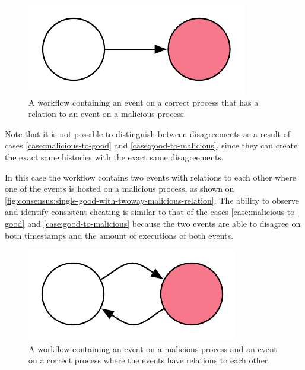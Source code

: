 	\begin{figure}[H]
		\centering
		\includegraphics[]{5validation/images/2.pdf}
		\caption{A workflow containing an event on a correct process that has a relation to an event on a malicious process.}
		\label{fig:consensus:single-good-with-malicious-relation}
	\end{figure}

	\noindent Note that it is not possible to distinguish between disagreements as a result of cases \ref{case:malicious-to-good} and \ref{case:good-to-malicious}, since they can create the exact same histories with the exact same disagreements.
	
	\begin{case}
		In this case the workflow contains two events with relations to each other where one of the events is hosted on a malicious process, as shown on \autoref{fig:consensus:single-good-with-twoway-malicious-relation}. The ability to observe and identify consistent cheating is similar to that of the cases \ref{case:malicious-to-good} and \ref{case:good-to-malicious} because the two events are able to disagree on both timestamps and the amount of executions of both events.
	\end{case}
	
	\begin{figure}[H]
		\centering
		\includegraphics[]{5validation/images/6.pdf}
		\caption{A workflow containing an event on a malicious process and an event on a correct process where the events have relations to each other.}
		\label{fig:consensus:single-good-with-twoway-malicious-relation}
	\end{figure}
	
